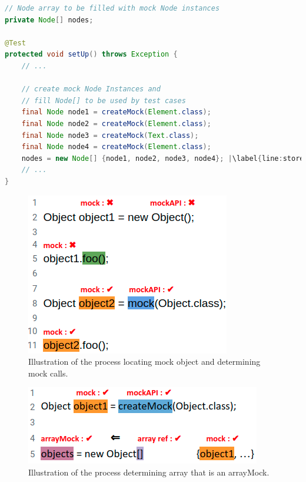 \begin{lstlisting}[basicstyle=\ttfamily, caption={This example illustrates a field array container holding mock objects from \textit{setup()} in \texttt{NodeListIteratorTest.java}.},
basicstyle=\scriptsize\ttfamily,language = Java, framesep=4.5mm, framexleftmargin=1.0mm, captionpos=b, xleftmargin=3.5ex, label=lis:container, escapechar=|]
// Node array to be filled with mock Node instances
private Node[] nodes;

@Test
protected void setUp() throws Exception {
    // ...

    // create mock Node Instances and 
    // fill Node[] to be used by test cases
    final Node node1 = createMock(Element.class);
    final Node node2 = createMock(Element.class);
    final Node node3 = createMock(Text.class);
    final Node node4 = createMock(Element.class);
    nodes = new Node[] {node1, node2, node3, node4}; |\label{line:storeMocksInArray}|
    // ...
}
\end{lstlisting}


\begin{figure}
    \includegraphics[width=.25\textwidth]{Images/mockInvocationIllustration.png}
    
    \caption{Illustration of the process locating mock object and determining mock calls.}
    \label{fig:focalMethodIllustration}
    
\end{figure}

\begin{figure}
    \includegraphics[width=.25\textwidth]{Images/arrayMockIllustration.png}
    
    \caption{Illustration of the process determining array that is an arrayMock.}
    \label{fig:arrayMockIllustration}
    
\end{figure}
